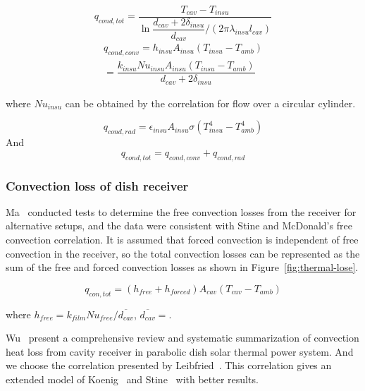 \documentclass{article}
\begin{document}
\begin{equation*}
	q_{cond,tot}=\dfrac{T_{cav}-T_{insu}}{\ln\dfrac{d_{cav}+2\delta_{insu}}{d_{cav}}/(2\pi\lambda_{insu}l_{cav})}
\end{equation*}
\begin{equation*}
\begin{split}
	q_{cond,conv}=h_{insu}A_{insu}(T_{insu}-T_{amb})
	\\=\dfrac{k_{insu}Nu_{insu}A_{insu}(T_{insu}-T_{amb})}{d_{cav}+2\delta_{insu}}
\end{split}
\end{equation*}

where $Nu_{insu}$ can be obtained by the correlation for flow over a circular cylinder.~\cite{Churchill1977} 

\begin{equation*}
	q_{cond,rad}=\epsilon_{insu}A_{insu}\sigma(T_{insu}^4 - T_{amb}^4)	
\end{equation*}
And 
\begin{equation*}
	q_{cond,tot}=q_{cond,conv}+q_{cond,rad}	
\end{equation*}

\subsubsection{Convection loss of dish receiver}
Ma~\cite{Ma1993} conducted tests to determine the free convection losses from the receiver for alternative setups, and the data were consistent with Stine and McDonald's free convection correlation. It is assumed that forced convection is independent of free convection in the receiver, so the total convection losses can be represented as the sum of the free and forced convection losses as shown in Figure~\ref{fig:thermal-lose}.

\begin{equation*}
	q_{con,tot} = (h_{free} + h_{forced})A_{cav}(T_{cav}-T_{amb})
\end{equation*}


where $h_{free}=k_{film}Nu_{free}/\overline{d_{cav}}$, $\overline{d_{cav}}=$.

Wu~\cite{Wu2010} present a comprehensive review and systematic summarization of convection heat loss from cavity receiver in parabolic dish solar thermal power system. And we choose the correlation presented by Leibfried~\cite{Leibfried1995}. This correlation gives an extended model of Koenig~\cite{Koenig1981} and Stine~\cite{Stine1994} with better results.
\end{document}

